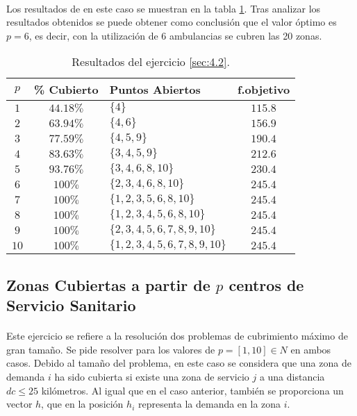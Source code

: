 \documentclass[spanish]{article}
\begin{document}
			\paragraph{}
			Los resultados de en este caso se muestran en la tabla \ref{table:sol-4.2}. Tras analizar los resultados obtenidos se puede obtener como conclusión que el valor óptimo es $p = 6$, es decir, con la utilización de 6 ambulancias se cubren las 20 zonas.


			\begin{table}[h]
				\begin{center}
					\begin{tabular}{|c || c || l || c | }
						\hline
						$p$		&	\% Cubierto	& Puntos Abiertos 					& f.objetivo \\ \hline \hline
						$1$ 	& $44.18\%$ & $\{4\}$ 										& $115.8$ \\ \hline
		     		$2$ 	& $63.94\%$ & $\{4, 6\}$									& $156.9$ \\ \hline
						$3$ 	& $77.59\%$ & $\{4,5,9\}$ 								& $190.4$ \\ \hline
						$4$ 	& $83.63\%$ & $\{3,4,5,9\}$ 							& $212.6$ \\ \hline
						$5$ 	& $93.76\%$ & $\{3,4,6,8,10\}$ 						& $230.4$ \\ \hline
						$6$ 	& $100\%$ 	& $\{2,3,4,6,8,10\}$					& $245.4$ \\ \hline
						$7$ 	& $100\%$ 	& $\{1,2,3,5,6,8,10 \}$				& $245.4$ \\ \hline
						$8$ 	& $100\%$ 	& $\{1,2,3,4,5,6,8,10\}$			& $245.4$ \\ \hline
						$9$ 	& $100\%$ 	& $\{2,3,4,5,6,7,8,9,10\}$ 		& $245.4$ \\ \hline
						$10$	& $100\%$ 	& $\{1,2,3,4,5,6,7,8,9,10\}$	& $245.4$ \\
						\hline
					\end{tabular}
				\end{center}
				\caption{Resultados del ejercicio \ref{sec:4.2}.}
				\label{table:sol-4.2}
			\end{table}


		\subsection{Zonas Cubiertas a partir de $p$ centros de Servicio Sanitario}
		\label{sec:4.3}

			\paragraph{}
			Este ejercicio se refiere a la resolución dos problemas de cubrimiento máximo de gran tamaño. Se pide resolver para los valores de $p = [1, 10] \in N$ en ambos casos. Debido al tamaño del problema, en este caso se considera que una zona de demanda $i$ ha sido cubierta si existe una zona de servicio $j$ a una distancia $dc \leq 25$ kilómetros. Al igual que en el caso anterior, también se proporciona un vector $h$, que en la posición $h_i$ representa la demanda en la zona $i$.
\end{document}

